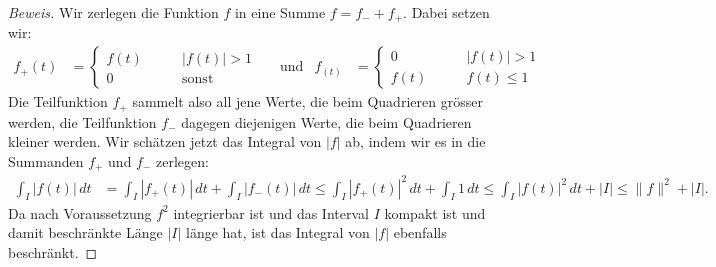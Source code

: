 \begin{proof}[Beweis]
Wir zerlegen die Funktion $f$ in eine Summe $f=f_-+f_+$. 
Dabei setzen wir:
\begin{align*}
f_+(t) &= 
\begin{cases}
f(t)&\qquad |f(t)| > 1\\
0   &\qquad\text{sonst}
\end{cases}
&&\text{und}
&
f_(t)
&=
\begin{cases}
0   &\qquad |f(t)| > 1\\
f(t)&\qquad f(t)\le 1
\end{cases}
\end{align*}
Die Teilfunktion $f_+$ sammelt also all jene Werte, die beim Quadrieren
grösser werden, die Teilfunktion $f_-$ dagegen diejenigen Werte, die
beim Quadrieren kleiner werden.
Wir schätzen jetzt das Integral von $|f|$ ab, indem wir es in die Summanden
$f_+$ und $f_-$ zerlegen:
\begin{align*}
\int_I |f(t)|\,dt
&=
\int_I |f_+(t)|\,dt + \int_I |f_-(t)|\,dt
\le
\int_I |f_+(t)|^2\,dt + \int_I 1\,dt
\le 
\int_I |f(t)|^2\,dt + |I|
\le \|f\|^2 + |I|.
\end{align*}
Da nach Voraussetzung $f^2$ integrierbar ist und das Interval $I$ kompakt ist
und damit beschränkte Länge $|I|$ länge hat, ist das Integral von $|f|$
ebenfalls beschränkt.
\end{proof}

